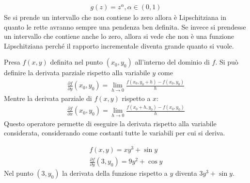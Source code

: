 \documentclass[a4paper, oneside]{book}
\begin{document}
\begin{example}
    \begin{gather*}
        g(z) = z^{\alpha}, \alpha \in (0,  1) 
    \end{gather*}
    Se si prende un intervallo che non contiene lo zero allora è Lipschitziana
    in quanto le rette avranno sempre una pendenza ben definita. Se invece si prendesse un intervallo che contiene anche lo
    zero, allora si vede che non è una funzione Lipschitziana perché il rapporto
    incrementale diventa grande quanto si vuole. 
\end{example}
\begin{definition}
    Presa $f(x, y)$ definita nel punto $(x_0, y_0)$ all'interno del dominio di $f$.
    Si può definire la derivata parziale rispetto alla variabile
    $y$ come
    \begin{align}
        \frac{\partial f}{\partial y}(x_0, y_0) = \lim_{h \to 0}   \frac{f(x_0, y_0 + h) - f(x_0, y_0)}{h}
    \end{align}
    Mentre la derivata parziale di $f(x, y)$ rispetto a $x$:
    \begin{align}
        \frac{\partial f}{\partial x}(x_0, y_0) = \lim_{h \to 0} \frac{f(x_0 + h, y_0) - f(x_0, y_0)}{h}  
    \end{align}
    Questo operatore permette di eseguire la derivata rispetto alla variabile considerata, considerando
    come costanti tutte le variabili per cui si deriva.
\end{definition}
\begin{example}
    \begin{gather*}
        f(x, y) = xy^{3} + \sin y \\
        \frac{\partial f}{\partial y}(3, y_0) = 9y^{2} + \cos y    
    \end{gather*}
    Nel punto $(3, y_0)$ la derivata della funzione rispetto a $y$ diventa $3y^{3} + \sin y$. 
\end{example}


\clearpage
\end{document}
